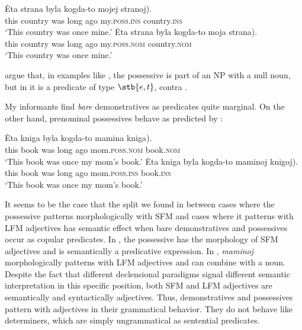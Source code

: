 \documentclass[output=paper]{langscibook}
\begin{document}

\ea
    \ea \gll Ėta strana byla kogda-to mojej \minsp{(} stranoj).\label{stranoj}\\
    this country was {long ago} my.\textsc{poss.ins} {} country.\textsc{ins}\\
    \glt `This country was once mine.'
    \ex \gll Ėta strana byla kogda-to moja \minsp{(*} strana).\label{mojastrana}\\
    this country was {long ago} my.\textsc{poss.nom} {} country.\textsc{nom}\\
    \glt `This country was once mine.'
\z\z


\noindent \citeauthor{Partee.Borschev2003} argue that, in examples like , the possessive is part of an NP with a null noun, but in  it is a predicate of type $\stb{e,t}$, contra \citet{Pereltsvaig2007}.

My informants find \textit{bare} demonstratives as predicates quite marginal. On the other hand, prenominal possessives behave as predicted by \citet{Partee.Borschev2003}:


\ea
    \ea \gll Ėta kniga byla kogda-to mamina \minsp{(*} kniga).\label{maminakniga}\\
    this book was {long ago} mom.\textsc{poss.nom} {} book.\textsc{nom}\\
    \glt `This book was once my mom's book.'
    \ex \gll Ėta kniga byla kogda-to maminoj \minsp{(} knigoj).\label{maminojknigoj}\\
    this book was {long ago} mom.\textsc{poss.ins} {} book.\textsc{ins}\\
    \glt `This book was once my mom's book.'
\z\z

\noindent It seems to be the case that the split we found in  between cases where the possessive patterns morphologically with SFM and cases where it patterns with LFM adjectives has semantic effect when bare demonstratives and possessives occur as copular predicates. In , the possessive has the morphology of SFM adjectives and is semantically a predicative expression. In , \textit{maminoj} morphologically patterns with LFM adjectives and can combine with a noun. Despite the fact that different declensional paradigms signal different semantic interpretation in this specific position, both SFM and LFM adjectives are semantically and syntactically adjectives. Thus, demonstratives and possessives pattern with adjectives in their grammatical behavior. They do not behave like determiners, which are simply ungrammatical as sentential predicates. 
\end{document}
